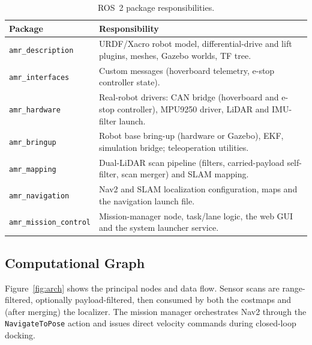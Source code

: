 \documentclass[11pt,a4paper]{article}
\newcommand{\code}[1]{\texttt{\small #1}}
\begin{document}
\begin{table}[h]\centering\small
\caption{ROS~2 package responsibilities.}\label{tab:packages}
\begin{tabular}{@{}lp{11.2cm}@{}}
\toprule
\textbf{Package} & \textbf{Responsibility}\\
\midrule
\code{amr\_description}   & URDF/Xacro robot model, differential-drive and lift
 plugins, meshes, Gazebo worlds, TF tree.\\
\code{amr\_interfaces}    & Custom messages (hoverboard telemetry, e-stop
 controller state).\\
\code{amr\_hardware}      & Real-robot drivers: CAN bridge (hoverboard and
 e-stop controller), MPU9250 driver, LiDAR and IMU-filter launch.\\
\code{amr\_bringup}       & Robot base bring-up (hardware or Gazebo), EKF,
 simulation bridge; teleoperation utilities.\\
\code{amr\_mapping}       & Dual-LiDAR scan pipeline (filters, carried-payload
 self-filter, scan merger) and SLAM mapping.\\
\code{amr\_navigation}    & Nav2 and SLAM localization configuration, maps and
 the navigation launch file.\\
\code{amr\_mission\_control} & Mission-manager node, task/lane logic, the web
 GUI and the system launcher service.\\
\bottomrule
\end{tabular}
\end{table}

\subsection{Computational Graph}
Figure~\ref{fig:arch} shows the principal nodes and data flow. Sensor scans
are range-filtered, optionally payload-filtered, then consumed by both the
costmaps and (after merging) the localizer. The mission manager orchestrates
Nav2 through the \code{NavigateToPose} action and issues direct velocity
commands during closed-loop docking.
\end{document}
